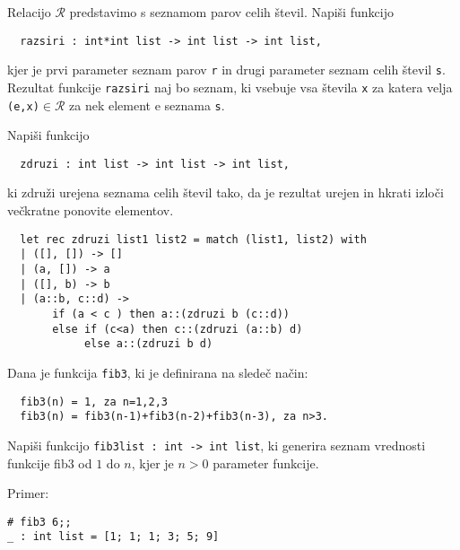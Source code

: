 \begin{ex}
  Relacijo $\mathcal{R}$ predstavimo s seznamom parov celih \v
  stevil. Napi\v si funkcijo

\begin{lstlisting}
  razsiri : int*int list -> int list -> int list,
\end{lstlisting}

  kjer je prvi parameter seznam parov \lstinline{r} in drugi parameter
  seznam celih \v stevil \lstinline{s}. Rezultat funkcije
  \lstinline{razsiri} naj bo seznam, ki vsebuje vsa \v stevila \lstinline{x}
  za katera velja \lstinline{(e,x)}$\in\mathcal{R}$ za nek element e
  seznama \lstinline{s}.


\end{ex} 
\begin{ex}
  Napi\v si funkcijo

\begin{lstlisting}
  zdruzi : int list -> int list -> int list,
\end{lstlisting}

  ki zdru\v zi urejena seznama celih \v stevil tako, da je rezultat
  urejen in hkrati izlo\v ci ve\v ckratne ponovite elementov.


  \begin{sol}
\begin{lstlisting}
  let rec zdruzi list1 list2 = match (list1, list2) with
  | ([], []) -> []
  | (a, []) -> a
  | ([], b) -> b
  | (a::b, c::d) -> 
       if (a < c ) then a::(zdruzi b (c::d))
       else if (c<a) then c::(zdruzi (a::b) d)
            else a::(zdruzi b d)
\end{lstlisting}
  \end{sol}

\end{ex} 
\begin{ex}
  Dana je funkcija \lstinline{fib3}, ki je definirana na slede\v c na\v cin:
\begin{lstlisting}
  fib3(n) = 1, za n=1,2,3
  fib3(n) = fib3(n-1)+fib3(n-2)+fib3(n-3), za n>3.
\end{lstlisting}

  Napi\v si funkcijo 
  \lstinline{fib3list : int -> int list}, ki generira seznam
  vrednosti funkcije fib3 od $1$ do $n$, kjer je $n>0$ parameter funkcije.

\noindent\/Primer:
\begin{lstlisting}
# fib3 6;;
_ : int list = [1; 1; 1; 3; 5; 9]
\end{lstlisting}

%
%
%

\end{ex} 

